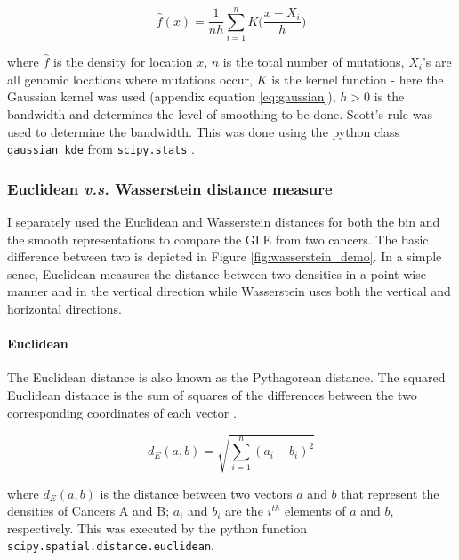 \begin{equation}
    \hat{f}(x) = \frac{1}{nh} \underset{i=1}{\overset{n}{\sum}} K\Big(\frac{x- X_i}{h}\Big)
    \label{eq:density}
\end{equation}

where $\hat{f}$ is the density for location $x$, $n$ is the total number of mutations, $X_i$'s are all genomic locations where mutations occur, $K$ is the kernel function - here the Gaussian kernel was used (appendix equation \ref{eq:gaussian}), $h>0$ is the bandwidth and determines the level of smoothing to be done. Scott's rule \citep[appendix equation \ref{eq:bandwidth};][]{Scott1992MultivariateEstimation} was used to determine the bandwidth. This was done using the python class \texttt{gaussian\_kde} from \texttt{scipy.stats} \citep{2020SciPy-NMeth}.

\subsubsection{Euclidean \textit{v.s.} Wasserstein distance measure}
I separately used the Euclidean \citep{ONeill2006FrameFields} and Wasserstein \citep{Kolouri2017OptimalApplications} distances for both the bin and the smooth representations to compare the GLE from two cancers. The basic difference between two is depicted in Figure \ref{fig:wasserstein_demo}. In a simple sense, Euclidean measures the distance between two densities in a point-wise manner and in the vertical direction while Wasserstein uses both the vertical and horizontal directions. 

\paragraph{Euclidean} The Euclidean distance is also known as the Pythagorean distance. The squared Euclidean distance is the sum of squares of the differences between the two corresponding coordinates of each vector \citep[equation \ref{eq:euclid};][]{ONeill2006FrameFields}.

\begin{equation}
    d_E(a,b) = \sqrt{\sum_{i=1}^n (a_i - b_i)^2}
    \label{eq:euclid}
\end{equation}

where $d_E(a,b)$ is the distance between two vectors $a$ and $b$ that represent the densities of Cancers A and B; $a_i$ and $b_i$ are the $i^{th}$ elements of $a$ and $b$, respectively. This was executed by the python function \texttt{scipy.spatial.distance.euclidean}.

